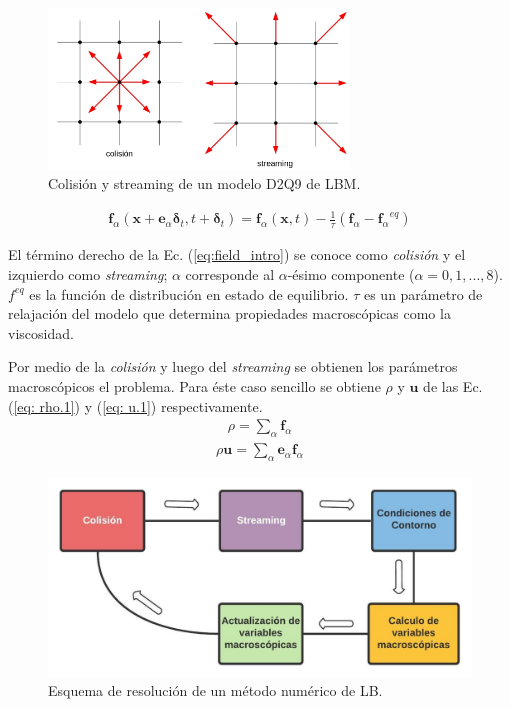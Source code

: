 \begin{figure}[h!]
	\centering
	\includegraphics[width=8cm]{grilla_stre_colli_intro.png}
	\caption{Colisión y streaming de un modelo D2Q9 de LBM.}
	\label{fig:grilla_D2Q9}
\end{figure}


\begin{align}
	\mathbf{f}_{\alpha} (\mathbf{x} + \mathbf{e}_{\alpha} \mathbf{\delta}_{t}, t + \mathbf{\delta}_{t})  = \mathbf{f}_{\alpha} (\mathbf{x}, t) - \frac{1}{\tau} (\mathbf{f}_{\alpha} - {\mathbf{f}_{\alpha}}^{eq})
	\label{eq:field_intro} 
\end{align}

El término derecho de la Ec. (\ref{eq:field_intro}) se conoce como \textit{colisión} y el izquierdo como \textit{streaming}; $\alpha$ corresponde al  $\alpha$-ésimo componente  ($\alpha = 0, 1, ... ,8$). $f^{eq}$ es la función de distribución en estado de equilibrio. $\tau$ es un parámetro de relajación del modelo que determina propiedades macroscópicas como la viscosidad.

Por medio de la \textit{colisión} y luego del \textit{streaming} se obtienen los parámetros macroscópicos el problema. Para éste caso sencillo se obtiene $\rho$ y $\mathbf{u}$ de las Ec. (\ref{eq: rho.1}) y (\ref{eq: u.1}) respectivamente.
\begin{align}
	\rho = \sum_{\alpha} \mathbf{f}_{\alpha}
	\label{eq: rho.1}
\end{align}
\begin{align}
	\rho \mathbf{u}= \sum_{\alpha} \mathbf{e}_{\alpha} \mathbf{f}_{\alpha}
	\label{eq: u.1}
\end{align}

\begin{figure}[H]
	\centering
	\includegraphics[width=14cm]{figs/cap1/esquema_LBM}
	\caption{Esquema de resolución de un método numérico de LB.}
	\label{fig:esquema_lbm}
\end{figure}

